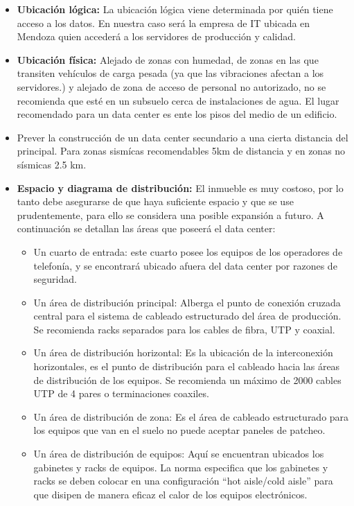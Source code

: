     \begin{itemize}
        \item \textbf{Ubicación lógica: } La ubicación lógica  viene determinada por quién tiene acceso a los datos. En nuestra caso será la empresa de IT ubicada en Mendoza quien accederá a los servidores de producción y calidad.
        \item \textbf{Ubicación física:} Alejado de zonas con humedad, de zonas en las que transiten vehículos de carga pesada (ya que las vibraciones afectan a los servidores.) y alejado de zona de acceso de personal no autorizado, no se recomienda que esté en un subsuelo cerca de instalaciones de agua. El lugar recomendado para un data center es ente los pisos del medio de un edificio.
        \item Prever la construcción de un data center secundario a una cierta distancia del principal. Para zonas sismícas recomendables 5km de distancia y en zonas no sísmicas 2.5 km.
        \item \textbf{Espacio y diagrama de distribución:} El inmueble es muy costoso, por lo tanto debe asegurarse de que haya suficiente espacio y que se use prudentemente, para ello se considera una posible expansión a futuro. A continuación se detallan las áreas que poseerá el data center:
        \begin{itemize}
            \item Un cuarto de entrada: este cuarto posee los equipos de los operadores de telefonía, y se encontrará ubicado afuera del data center por razones de seguridad.
            \item Un área de distribución principal: Alberga el punto de conexión cruzada central para el sistema de cableado estructurado del área de producción. Se recomienda racks separados para los cables de fibra, UTP y coaxial.
            \item Un área de distribución horizontal: Es la ubicación de la interconexión horizontales, es el punto de distribución para el cableado hacia las áreas de distribución de los equipos. Se recomienda un máximo de 2000 cables UTP de 4 pares o terminaciones coaxiles.
            \item Un área de distribución de zona: Es el área de cableado estructurado para los equipos que van en el suelo no puede aceptar paneles de patcheo.
            \item Un área de distribución de equipos: Aquí se encuentran ubicados los gabinetes y racks de equipos. La norma especifica que los gabinetes y racks se deben colocar en una configuración ``hot aisle/cold aisle'' para que disipen de manera eficaz el calor de los equipos electrónicos.

\end{itemize}
\end{itemize}
